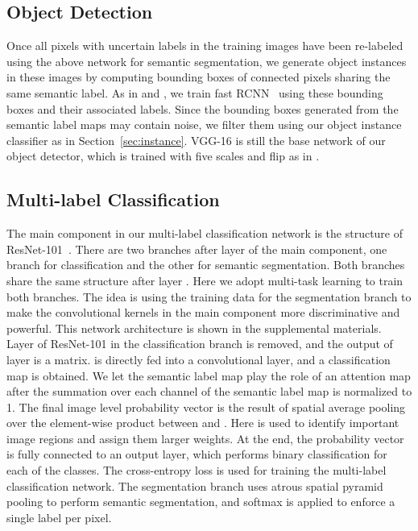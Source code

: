 \documentclass[10pt,twocolumn,letterpaper]{article}
\begin{document}
\subsection{Object Detection}\label{sec:detection}\vspace{-2mm}
Once all pixels with uncertain labels in the training images have been re-labeled using the above network for semantic segmentation, we generate object instances in these images by computing bounding boxes of connected pixels sharing the same semantic label. As in \cite{tang2017multiple} and \cite{li2016weakly}, we train fast RCNN~\cite{girshick2015fast} using these bounding boxes and their associated labels. Since the bounding boxes generated from the semantic label maps may contain noise, we filter them using our object instance classifier as in Section~\ref{sec:instance}. VGG-16 is still the base network of our object detector, which is trained with five scales and flip as in \cite{tang2017multiple}.
\vspace{-2mm}

\subsection{Multi-label Classification}\label{sec:classification}\vspace{-2mm}
The main component in our multi-label classification network is the structure of ResNet-101~\cite{he2016deep}.
There are two branches after layer  of the main component, one branch for classification and the other for semantic segmentation. Both branches share the same structure after layer .  Here we adopt multi-task learning to train both branches. The idea is using the training data for the segmentation branch to make the convolutional kernels in the main component more discriminative and powerful.
This network architecture is shown in the supplemental materials. Layer  of ResNet-101 in the classification branch is removed, and the output  of layer  is a  matrix.  is directly fed into a  convolutional layer, and a classification map  is obtained.  We let the semantic label map  play the role of an attention map  after the summation over each channel of the semantic label map is normalized to 1. The final image level probability vector  is the result of spatial average pooling over the element-wise product between  and . Here  is used to identify important image regions and assign them larger weights.
At the end, the probability vector  is fully connected to an output layer, which performs binary classification for each of the  classes. The cross-entropy loss is used for training the multi-label classification network.
The segmentation branch uses atrous spatial pyramid pooling to perform semantic segmentation, and softmax is applied to enforce a single label per pixel.
\end{document}
